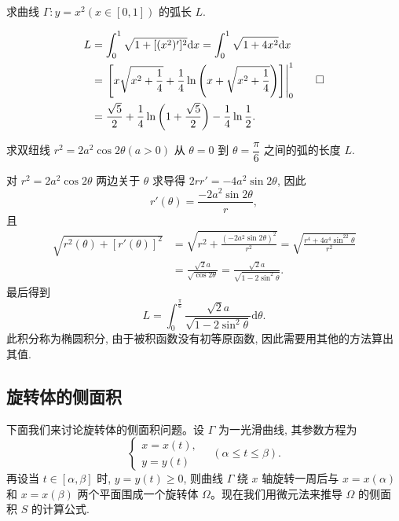 \begin{example}\label{example:ma-7-6-8}
求曲线 $\Gamma:y=x^2(x\in[0,1])$ 的弧长 $L$.
\end{example}


\begin{solve}
\[
\begin{aligned}
  L&=\int_0^1\sqrt{1+[(x^2)']^2}\mathrm dx
  =\int_0^1\sqrt{1+4x^2}\mathrm dx\\
  &=\left.\left[x\sqrt{x^2+\frac{1}{4}}
  +\frac{1}{4}\ln\left(x+\sqrt{x^2+\frac{1}{4}}\right)\right]\right|_0^1\\
  &=\frac{\sqrt5}{2}+\frac{1}{4}\ln\left(1+\frac{\sqrt5}{2}\right)-\frac{1}{4}\ln\frac{1}{2}.
\end{aligned}
\qedhere
\]
\end{solve}


\begin{example}\label{example:ma-7-6-9}
求双纽线 $r^2=2a^2\cos2\theta(a>0)$ 从 $\theta=0$ 到 $\theta=\dfrac{\pi}{6}$ 之间的弧的长度 $L$.
\end{example}


\begin{solve}
对 $r^2=2a^2\cos2\theta$ 两边关于 $\theta$ 求导得 $2rr'=-4a^2\sin2\theta$, 因此
\[
  r'(\theta)=\frac{-2a^2\sin2\theta}{r},
\]
且
\[
\begin{aligned}
  \sqrt{r^2(\theta)+[r'(\theta)]^2}
  &=\sqrt{r^2+\frac{(-2a^2\sin2\theta)^2}{r^2}}
  =\sqrt{\frac{r^4+4a^4\sin^22\theta}{r^2}}\\
  &=\frac{\sqrt2a}{\sqrt{\cos2\theta}}
  =\frac{\sqrt2a}{\sqrt{1-2\sin^2\theta}}.
\end{aligned}
\]
最后得到
\[
  L=\int_0^{\frac{\pi}{6}}\frac{\sqrt2a}{\sqrt{1-2\sin^2\theta}}\mathrm d\theta.
\]
此积分称为椭圆积分, 由于被积函数没有初等原函数, 因此需要用其他的方法算出其值.
\end{solve}


\subsection{旋转体的侧面积}
\label{subsec:ma-7-6-7}

下面我们来讨论旋转体的侧面积问题。设 $\Gamma$ 为一光滑曲线, 其参数方程为
\[
  \begin{cases}
    x=x(t),\\
    y=y(t)
  \end{cases}
  \quad(\alpha\leq t\leq\beta).
\]
再设当 $t\in[\alpha,\beta]$ 时, $y=y(t)\geq0$, 则曲线 $\Gamma$ 绕 $x$ 轴旋转一周后与 $x=x(\alpha)$ 和 $x=x(\beta)$ 两个平面围成一个旋转体 $\Omega$。现在我们用微元法来推导 $\Omega$ 的侧面积 $S$ 的计算公式.

